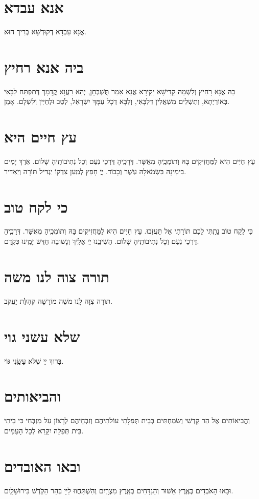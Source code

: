\documentclass{songsheet}
\begin{document}
\section{אנא עבדא}
אֲנָא עַבְדָּא דְקוּדְשָׁא בְּרִיךְ הוּא.
\section{ביה אנא רחיץ}
בֵּהּ אֲנָא רָחִיץ וְלִשְׁמֵהּ קַדִּישָׁא יַקִּירָא אֲנָא אֵמַר תֻּשְׁבְּחָן, יְהֵא רַעֲוָא קֳדָמָךְ דְּתִפְתַּח לִבָּאִי בְּאוֹרַיְתָא, וְתַשְׁלִים מִשְׁאֲלִין דְּלִבָּאִי, וְלִבָּא דְכָל עַמָּךְ יִשְׂרָאֵל, לְטַב וּלְחַיִּין וְלִשְׁלָם. אָמֵן.
\section{עץ חיים היא}
עֵץ חַיִּים הִיא לַמַּחֲזִיקִים בָּהּ וְתוֹמְכֶֽיהָ מְאֻשָּׁר. דְּרָכֶֽיהָ דַּרְכֵי נֹֽעַם וְכָל נְתִיבוֹתֶֽיהָ שָׁלוֹם. אֹֽרֶךְ יָמִים בִּימִינָהּ בִּשְׂמֹאלָהּ עֽשֶׁר וְכָבוֹד. ײֳ חָפֵץ לְמַֽעַן צִדְקוֹ יַגְדִּיל תּוֹרָה וְיַאְדִּיר.
\section{כי לקח טוב}
כִּי לֶֽקַח טוֹב נָתַֽתִּי לָכֶם תּוֹרָתִי אַל תַּעֲזֹֽבוּ. עֵץ חַיִּים הִיא לַמַּחֲזִיקִים בָּהּ וְתוֹמְכֶֽיהָ מְאֻשָּׁר. דְּרָכֶֽיהָ דַּרְכֵי נֹֽעַם וְכָל נְתִיבוֹתֶֽיהָ שָׁלוֹם. הֲשִׁיבֵֽנוּ ײֳ אֵלֶֽיךָ וְנָשׁוּבָה חַדֵּשׁ יָמֵֽינוּ כְּקֶֽדֶם.
\section{תורה צוה לנו משה}
תּוֹרָה צִוָּה לָֽנוּ מֹשֶׁה מוֹרָשָׁה קְהִלַּת יַעֲקֹב.
\section{שלא עשני גוי}
בָּרוּךְ ײֳ שֶׁלֹּא עָשַֽׂנִי גּוֹי.
\section{והביאותים}
וַהֲבִיאוֹתִים אֶל הַר קׇדְשִׁי וְשִׂמַּחְתִּים בְּבֵית תְּפִלָּתִי עוֹלֹתֵיהֶם וְזִבְחֵיהֶם לְרָצוֹן עַל מִזְבְּחִי כִּי בֵיתִי בֵּית תְּפִלָּה יִקָּרֵא לְכָל הָעַמִּים.
\section{ובאו האובדים}
 וּבָאוּ הָאֹבְדִים בְּאֶֽרֶץ אַשּׁוּר וְהַנִּדָּחִים בְּאֶֽרֶץ מִצְרָֽיִם וְהִשְׁתַּחֲווּ לַײָ בְּהַר הַקֹּֽדֶשׁ בִּירוּשָׁלָֽיִם.
\end{document}
